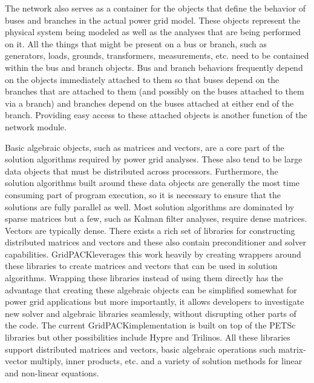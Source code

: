 \documentclass{acm_proc_article-sp}
\begin{document}
The network also serves as a container for the objects that define the behavior
of buses and branches in the actual power grid model. These objects represent
the physical system being modeled as well as the analyses that are being
performed on it. All the things that might be present on a bus or branch,
such as generators, loads, grounds, transformers, measurements, etc. need to be
contained within the bus and branch objects. Bus and branch behaviors frequently
depend on the objects immediately attached to them so that buses depend on the
branches that are attached to them (and possibly on the buses attached to them
via a branch) and branches depend on the buses attached at either end of the
branch. Providing easy access to these attached objects is another function of the
network module.

Basic algebraic objects, such as matrices and vectors, are a core part
of the solution algorithms required by power grid analyses. These also tend to
be large data objects that must be distributed across processors. Furthermore,
the solution algorithms built around these data objects are generally the most
time consuming part of program execution, so it is necessary to ensure that the
solutions are fully parallel as well. Most solution algorithms
are dominated by sparse matrices but a few, such as Kalman filter
analyses\cite{KAL}, require dense
matrices. Vectors are typically dense. There exists a rich set of libraries for
constructing distributed matrices and vectors and these also contain preconditioner
and solver capabilities.  GridPACK\texttrademark leverages this work heavily by
creating wrappers
around these libraries to create matrices and vectors that can be used in solution
algorithms. Wrapping these libraries instead of using them directly has the
advantage that creating these algebraic objects can be simplified somewhat for power grid
applications but more importantly, it allows developers to investigate new
solver and algebraic libraries seamlessly, without disrupting other parts of the code.
The current GridPACK\texttrademark implementation is built on top of the
PETSc\cite{PETSC}
libraries but other possibilities include Hypre\cite{HYPRE} and
Trilinos\cite{TRIL}. All these
libraries support distributed matrices and vectors, basic algebraic operations
such matrix-vector multiply, inner products, etc. and a variety of solution
methods for linear and non-linear equations.
\end{document}
